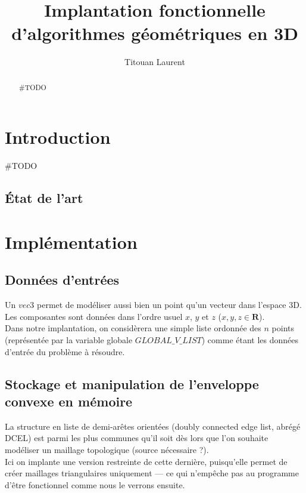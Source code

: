 \documentclass[]{article}
\title{Implantation fonctionnelle d'algorithmes géométriques en 3D}
\author{Titouan Laurent}
\date{}
\begin{document}
	
	\maketitle
	\begin{abstract}
		\#TODO
	\end{abstract}

\begin{multicols}{2}
\section{Introduction}
	\#TODO

\subsection{État de l'art}

\section{Implémentation}

\subsection{Données d'entrées}
	Un $vec3$ permet de modéliser aussi bien un point qu'un vecteur dans l'espace 3D. Les composantes sont données dans l'ordre usuel $x$, $y$ et $z$ ($x, y, z \in \mathbf{R}$).\\
	Dans notre implantation, on considèrera une simple liste ordonnée des $n$ points (représentée par la variable globale $GLOBAL\_V\_LIST$) comme étant les données d'entrée du problème à résoudre.

\subsection{Stockage et manipulation de l'enveloppe convexe en mémoire}
	La structure en liste de demi-arêtes orientées (doubly connected edge list, abrégé DCEL) est parmi les plus communes qu'il soit dès lors que l'on souhaite modéliser un maillage topologique (source nécessaire ?).\\
	Ici on implante une version restreinte de cette dernière, puisqu'elle permet de créer maillages triangulaires uniquement — ce qui n'empêche pas au programme d'être fonctionnel comme nous le verrons ensuite.


\end{multicols}
\end{document}

